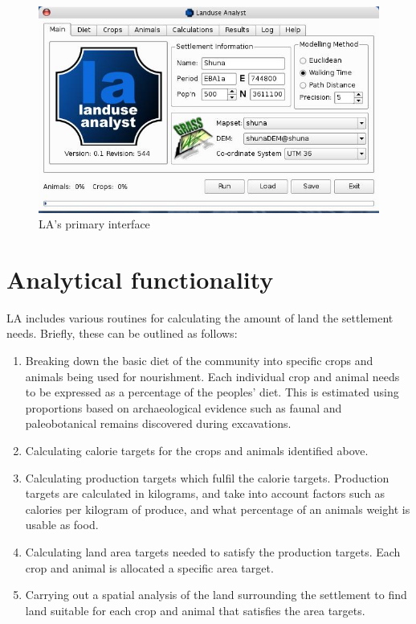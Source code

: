 \begin{figure}[htbp] %
  \includegraphics[scale=0.36]{./images/LanduseAnalyst544.jpg}
  \caption{\label{fig:la544}LA's primary interface}
\end{figure}

\section{Analytical functionality} \label{sec:Analytical Functionality}
  LA includes various routines for calculating the amount of land 
  the settlement needs.  Briefly, these can be outlined as follows:
  \begin{enumerate} 
    \item Breaking down the basic diet of the community into specific crops and
      animals being used for nourishment.  Each individual crop and animal needs to
      be expressed as a percentage of the peoples' diet.  This is estimated using
      proportions based on archaeological evidence such as faunal and
      paleobotanical remains discovered during excavations.  
    \item Calculating calorie targets for the crops and animals identified above.
    \item Calculating production targets which fulfil the calorie targets.
      Production targets are calculated in kilograms, and take into account factors
      such as calories per kilogram of produce, and what percentage of an animals
      weight is usable as food.  
    \item Calculating land area targets needed to satisfy the production targets.
      Each crop and animal is allocated a specific area target.  
    \item Carrying out a spatial analysis of the land surrounding the settlement
      to find land suitable for each crop and animal that satisfies the area
      targets.
  \end{enumerate}

